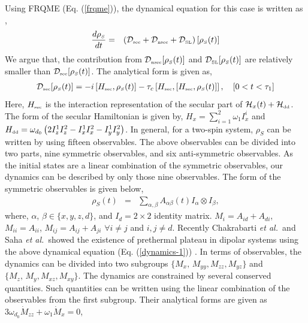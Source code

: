 \documentclass[prl,aps,preprint,floatfix]{revtex4-2}
\newcommand{\hdd}{\mathcal{H}_{\scriptscriptstyle \rm dd}}
\newcommand{\rh}{\rho_{\scriptscriptstyle  S}}
\newcommand{\etal}{\textit{et al.\ }}
\begin{document}
Using FRQME (Eq. (\ref{frqme})), the dynamical equation for this case is written as \cite{saha_cascaded_2023},
\begin{eqnarray}\label{dynamics-1}
\frac{d\rh}{dt}&=& \left( \mathcal{D}_{\scriptscriptstyle \rm sec} + \mathcal{D}_{\scriptscriptstyle \rm nsec} + \mathcal{D}_{\scriptscriptstyle \rm SL}\right) [\rh(t)]
\end{eqnarray}
We argue that, the contribution from $\mathcal{D}_{\scriptscriptstyle \rm nsec}[\rh(t)]$ and $\mathcal{D}_{\scriptscriptstyle \rm SL}[\rh(t)]$ are relatively smaller than $\mathcal{D}_{\scriptscriptstyle \rm sec}[\rh(t)]$. The analytical form is given as,
\begin{eqnarray}
\mathcal{D}_{\scriptscriptstyle \rm sec}[\rh(t)] = -i\left[H_{\scriptscriptstyle \rm sec}, \rh(t)\right] -  \tau_c\left[ H_{\scriptscriptstyle \rm sec},\left[H_{\scriptscriptstyle \rm sec},\rh(t) \right] \right],\quad [0<t<\tau_1]
\end{eqnarray}
 Here, $H_{\scriptscriptstyle \rm sec}$ is the interaction representation of the secular part of $\mathcal{H}_x(t) + \hdd$. The form of the secular Hamiltonian is given by, $H_x = \sum\limits_{i=1}^2 \omega_1 I_{x}^i$ and $H_{\scriptscriptstyle \rm dd} = \omega_{d_0} \left(2 I_z^1 I_z^2 - I_x^1 I_x^2 - I_y^1 I_y^2 \right) $. In general, for a two-spin system, $\rh$ can be written by using fifteen observables. The above observables can be divided into two parts, nine symmetric observables, and six anti-symmetric observables. As the initial states are a linear combination of the symmetric observables, our dynamics can be described by only those nine observables. The form of the  symmetric observables is given below,
\begin{eqnarray}\label{obs}
\rh (t) &=& \sum\limits_{\alpha, \beta }  A_{\alpha \beta} (t)I_{\alpha} \otimes I_{\beta},
\end{eqnarray}
where, $\alpha$, $\beta \in \{x,y,z,d\}$, and $I_d = 2\times 2$ identity matrix.  $M_i = A_{id}  + A_{di}$, $M_{ii} = A_{ii}$, $M_{ij} = A_{ij} + A_{ji}$ $\forall i\neq j$ and $i,j \neq d$. Recently Chakrabarti \etal and Saha \etal showed the existence of prethermal plateau in dipolar systems using the above dynamical equation (Eq. (\ref{dynamics-1})) \cite{chakrabarti_2022_creation,saha_cascaded_2023}. In terms of observables, the dynamics can be divided into two subgroups $\{M_x,\, M_{yy}, M_{zz}, M_{yz}\}$ and  $\{M_z,\, M_{y}, M_{xz}, M_{xy}\}$. The dynamics are constrained by several conserved quantities. Such quantities can be written using the linear combination of the observables from the first subgroup. Their analytical forms are given as $3\omega_{d_0}\dot{M}_{zz}+\omega_1  \dot{M}_{x} = 0$,  
\end{document}
